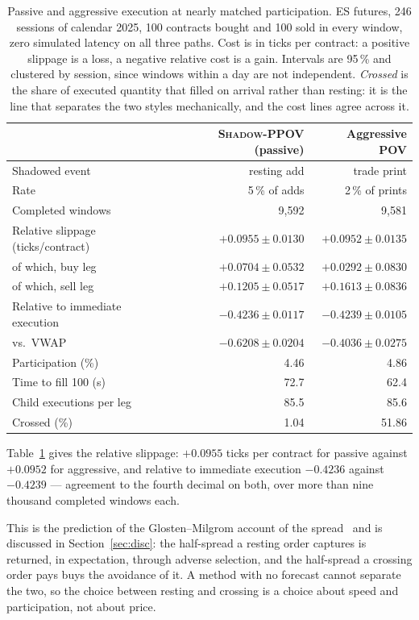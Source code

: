 \documentclass[11pt]{article}
\newcommand{\pov}{\textsc{Shadow-PPOV}}
\begin{document}
\begin{table}[t]
\centering
\caption{Passive and aggressive execution at nearly matched participation. ES futures,
246 sessions of calendar 2025, 100 contracts bought and 100 sold in every
window, zero simulated latency on all three paths. Cost is in ticks per
contract: a positive slippage is a loss, a negative relative cost is a gain.
Intervals are 95\,\% and clustered by session, since windows within a day are
not independent. \emph{Crossed} is the share of executed quantity that filled on
arrival rather than resting: it is the line that separates the two styles
mechanically, and the cost lines agree across it.}
\label{tab:styles}
\small
\begin{tabular}{lrr}
\toprule
 & \pov{} (passive) & Aggressive POV \\
\midrule
Shadowed event              & resting add & trade print \\
Rate                        & 5\,\% of adds & 2\,\% of prints \\
Completed windows           & 9{,}592 & 9{,}581 \\
\midrule
Relative slippage (ticks/contract) & $+0.0955 \pm 0.0130$ & $+0.0952 \pm 0.0135$ \\
\quad of which, buy leg     & $+0.0704 \pm 0.0532$ & $+0.0292 \pm 0.0830$ \\
\quad of which, sell leg    & $+0.1205 \pm 0.0517$ & $+0.1613 \pm 0.0836$ \\
Relative to immediate execution & $-0.4236 \pm 0.0117$ & $-0.4239 \pm 0.0105$ \\
vs.\ VWAP                   & $-0.6208 \pm 0.0204$ & $-0.4036 \pm 0.0275$ \\
\midrule
Participation (\%)          & 4.46 & 4.86 \\
Time to fill 100 (s)        & 72.7 & 62.4 \\
Child executions per leg    & 85.5 & 85.6 \\
Crossed (\%)                & 1.04 & 51.86 \\
\bottomrule
\end{tabular}
\end{table}

Table~\ref{tab:styles} gives the relative slippage: $+0.0955$
ticks per contract for passive against $+0.0952$ for aggressive, and relative to
immediate execution $-0.4236$ against $-0.4239$ --- agreement to the fourth
decimal on both, over more than nine thousand completed windows each.

This is the prediction of the Glosten--Milgrom account of the
spread~\cite{glostenmilgrom1985} and is discussed in Section~\ref{sec:disc}: the
half-spread a resting order captures is returned, in expectation, through
adverse selection, and the half-spread a crossing order pays buys the avoidance
of it. A method with no forecast cannot separate the two, so the choice between
resting and crossing is a choice about speed and participation, not about price.
\end{document}
